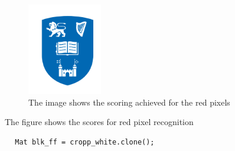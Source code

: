 \documentclass{article}
\begin{document}
\begin{figure}[H]
\center
\begin{subfigure}{0.5\textwidth}
\includegraphics[width=0.9\linewidth, height=4cm]{logo.png} 
\caption{The image shows the scoring achieved for the red pixels}
\label{fig:subim2}
\end{subfigure}
\caption{The figure shows the scores for red pixel recognition}
\label{fig:image2}
\end{figure}
















\begin{lstlisting}
		Mat blk_ff = cropp_white.clone();
	
\end{lstlisting}


\pagebreak
\end{document}
